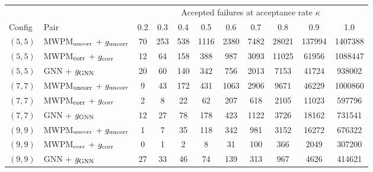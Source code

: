 \begin{tabular}{ll| c c c c c c c c c}
\toprule
 & & \multicolumn{9}{c}{Accepted failures at acceptance rate $\kappa$} \\
Config & Pair & 0.2 & 0.3 & 0.4 & 0.5 & 0.6 & 0.7 & 0.8 & 0.9 & 1.0 \\
\hline
\midrule
$(5, 5)$ & MWPM$_{\rm uncorr}$ + $g_{\rm uncorr}$ & 70 & 253 & 538 & 1116 & 2380 & 7482 & 28021 & 137994 & 1407388 \\
$(5, 5)$ & MWPM$_{\rm corr}$ + $g_{\rm corr}$ & 12 & 64 & 158 & 388 & 987 & 3093 & 11025 & 61956 & 1088447 \\
$(5, 5)$ & GNN + $g_{\rm GNN}$ & 20 & 60 & 140 & 342 & 756 & 2013 & 7153 & 41724 & 938002 \\
\hline
$(7, 7)$ & MWPM$_{\rm uncorr}$ + $g_{\rm uncorr}$ & 9 & 43 & 172 & 431 & 1063 & 2906 & 9671 & 46229 & 1000860 \\
$(7, 7)$ & MWPM$_{\rm corr}$ + $g_{\rm corr}$ & 2 & 8 & 22 & 62 & 207 & 618 & 2105 & 11023 & 597796 \\
$(7, 7)$ & GNN + $g_{\rm GNN}$ & 12 & 27 & 78 & 178 & 423 & 1122 & 3726 & 18162 & 731541 \\
\hline
$(9, 9)$ & MWPM$_{\rm uncorr}$ + $g_{\rm uncorr}$ & 1 & 7 & 35 & 118 & 342 & 981 & 3152 & 16272 & 676322 \\
$(9, 9)$ & MWPM$_{\rm corr}$ + $g_{\rm corr}$ & 0 & 1 & 2 & 8 & 31 & 100 & 366 & 2049 & 307200 \\
$(9, 9)$ & GNN + $g_{\rm GNN}$ & 27 & 33 & 46 & 74 & 139 & 313 & 967 & 4626 & 414621 \\
\bottomrule
\end{tabular}
